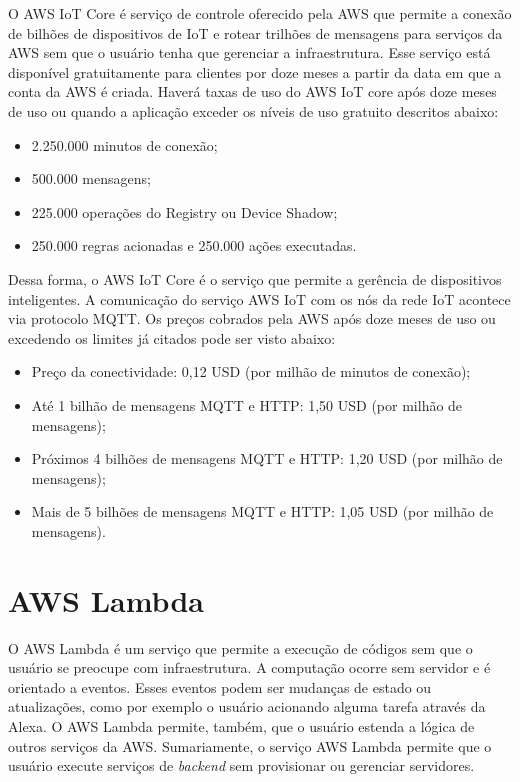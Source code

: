 O AWS IoT Core é serviço de controle oferecido pela AWS que permite a conexão de bilhões de dispositivos de IoT e rotear trilhões de mensagens para serviços da AWS sem que o usuário tenha que gerenciar a infraestrutura. Esse serviço está disponível gratuitamente para clientes por doze meses a partir da data em que a conta da AWS é criada. Haverá taxas de uso do AWS IoT core após doze meses de uso ou quando a aplicação exceder os níveis de uso gratuito descritos abaixo:

\begin{itemize}
	\item 2.250.000 minutos de conexão;
	\item 500.000 mensagens;
	\item 225.000 operações do Registry ou Device Shadow;
	\item 250.000 regras acionadas e 250.000 ações executadas.
\end{itemize}

Dessa forma, o AWS IoT Core é o serviço que permite a gerência de dispositivos inteligentes. A comunicação do serviço AWS IoT com os nós da rede IoT acontece via protocolo MQTT. Os preços cobrados pela AWS após doze meses de uso ou excedendo os limites já citados pode ser visto abaixo:

\begin{itemize}
	\item Preço da conectividade: 0,12 USD (por milhão de minutos de conexão);
	\item Até 1 bilhão de mensagens MQTT e HTTP: 1,50 USD (por milhão de mensagens);
	\item Próximos 4 bilhões de mensagens MQTT e HTTP: 1,20 USD (por milhão de mensagens);
	\item Mais de 5 bilhões de mensagens MQTT e HTTP: 1,05 USD (por milhão de mensagens).
\end{itemize}

\section{AWS Lambda}\label{section:aws_lambda}

O AWS Lambda é um serviço que permite a execução de códigos sem que o usuário se preocupe com infraestrutura. A computação ocorre sem servidor e é orientado a eventos. Esses eventos podem ser mudanças de estado ou atualizações, como por exemplo o usuário acionando alguma tarefa através da Alexa. O AWS Lambda permite, também, que o usuário estenda a lógica de outros serviços da AWS. Sumariamente, o serviço AWS Lambda permite que o usuário execute serviços de \textit{backend} sem provisionar ou gerenciar servidores.

